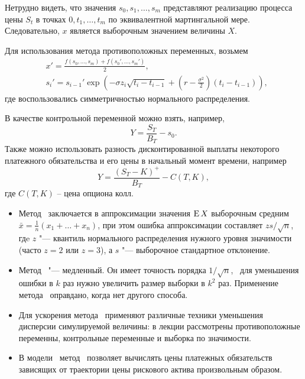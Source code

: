 Нетрудно видеть, что значения $s_0,s_1,\dots,s_m$ представляют реализацию процесса цены $S_t$ в точках $0,t_1,\dots,t_m$ по эквивалентной мартингальной мере.
Следовательно, $x$ является выборочным значением величины $X$.

Для использования метода противоположных переменных, возьмем 
\begin{align*}
&x' = \frac{f(s_0,\dots,s_m) + f(s_0', \dots,s_m')}{2}, \\
&s_i' = s_{i-1}' \exp\left(-\sigma z_i \sqrt{t_i - t_{i-1}}  + \left(r-\frac{\sigma^2}{2}\right)(t_i - t_{i-1})\right),
\end{align*}
где воспользовались симметричностью нормального распределения.

В качестве контрольной переменной можно взять, например,
\[
Y = \frac{S_T}{B_T} - s_0. 
\]
Также можно использовать разность дисконтированной выплаты некоторого платежного обязательства и его цены в начальный момент времени, например
\[
Y = \frac{(S_T-K)^+}{B_T} - C(T,K),
\]
где $C(T,K)$ -- цена опциона колл.


\summary

\begin{itemize}
\item Метод \mc\ заключается в аппроксимации значения $\operatorname{E} X$ выборочным средним $\bar x = \frac1n (x_1+\ldots + x_n)$, при этом ошибка аппроксимации составляет $zs/\sqrt{n}$, гдe $z$ "--- квантиль нормального распределения нужного уровня значимости (часто $z=2$ или $z=3$), а $s$ "--- выборочное стандартное отклонение.

\item Метод \mc\ "--- медленный. Он имеет точность порядка $1/\sqrt{n}$, \te\ для уменьшения ошибки в $k$ раз нужно увеличить размер выборки в $k^2$ раз.
Применение метода \mc\ оправдано, когда нет другого способа.

\item Для ускорения метода \mc\ применяют различные техники уменьшения дисперсии симулируемой величины: в лекции рассмотрены противоположные переменны, контрольные переменные и выборка по значимости.

\item В модели \bs\ метод \mc\ позволяет вычислять цены платежных обязательств зависящих от траектории цены рискового актива произвольным образом.
\end{itemize}
